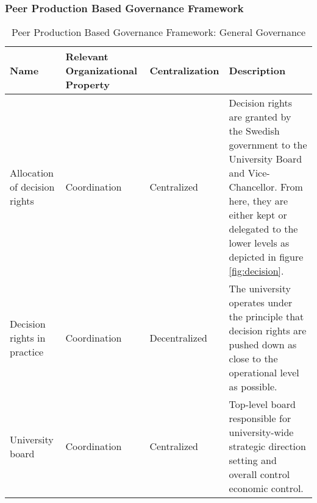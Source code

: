 
\subsubsection{Peer Production Based Governance Framework}

\begin{table}[H]
\caption{Peer Production Based Governance Framework: General Governance}
\label{table:peerGeneralGovernance}
\begin{tabular}{ | p{} | p{}| p{} | p{}|}
%
\hline
%
\textbf{Name} & 
\textbf{Relevant Organizational Property} &
\textbf{Centralization} &  
\textbf{Description} \\
%
\hline
%
 Allocation of decision rights & 
 Coordination &
 Centralized & 
 Decision rights are granted by the Swedish government to the University Board and Vice-Chancellor. From here, they are either kept or delegated to the lower levels as depicted in figure \ref{fig:decision}. \\
%
\hline
%
 Decision rights in practice & 
 Coordination &
 Decentralized & 
 The university operates under the principle that decision rights are pushed down as close to the operational level as possible. \\
%
\hline
%
%
%
 University board &
 Coordination &
 Centralized &
 Top-level board responsible for university-wide strategic direction setting and overall control economic control. \\
%
\hline
%
 

\end{tabular}
\end{table}
